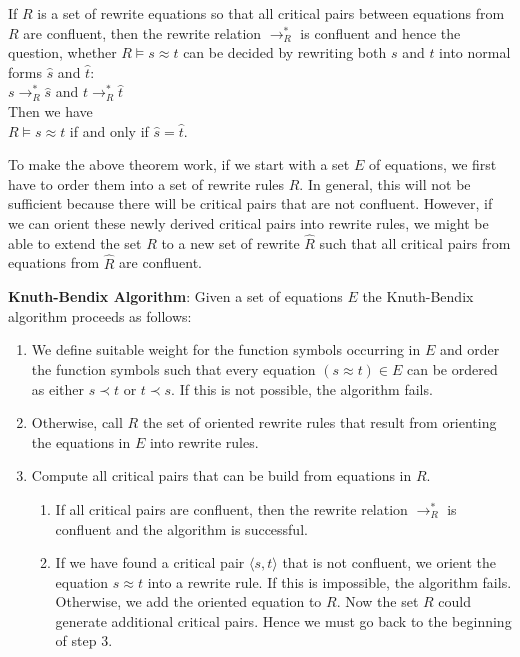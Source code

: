\begin{Theorem}
  If $R$ is a set of rewrite equations so that all critical pairs between equations from $R$ are confluent,
  then the rewrite relation $\rightarrow_R^*$ is confluent and hence the question, whether $R \models s \approx t$
  can be decided by rewriting both $s$ and $t$ into normal forms $\widehat{s}$ and $\widehat{t}$:
  \\[0.2cm]
  \hspace*{1.3cm}
  $s \rightarrow_R^* \widehat{s}$ \quad and \quad  $t \rightarrow_R^* \widehat{t}$ 
  \\[0.2cm]
  Then we have
  \\[0.2cm]
  \hspace*{1.3cm}
  $R \models s \approx t$ \quad if and only if \quad $\widehat{s} = \widehat{t}$.
\end{Theorem}

\noindent
To make the above theorem work, if we start with a set $E$ of equations, we first have to order them into a set
of rewrite rules $R$.  In general, this will not be sufficient because there will be critical pairs that are
not confluent. However, if we can orient these newly derived critical pairs into rewrite rules, we might be
able to extend the set $R$ to a new set of rewrite $\widehat{R}$ such that all critical pairs from equations
from $\widehat{R}$ are confluent.
\vspace*{0.2cm}

\noindent
\textbf{Knuth-Bendix Algorithm}:  Given a set of equations $E$ the Knuth-Bendix algorithm proceeds as follows:
\begin{enumerate}
\item We define suitable weight for the function symbols occurring in $E$ and order the function symbols
      such that every equation  $(s \approx t) \in E$ can be ordered as either $s \prec t$ or $t \prec s$.
      If this is not possible, the algorithm fails.
\item Otherwise, call $R$ the set of oriented rewrite rules that result from orienting the equations in $E$
      into rewrite rules.
\item Compute all critical pairs that can be build from equations in $R$.
      \begin{enumerate}
      \item If all critical pairs are confluent, then the rewrite relation $\rightarrow_R^*$ is confluent
            and the algorithm is successful.
      \item If we have found a critical pair $\langle s, t \rangle$ that is not confluent,
            we orient the equation $s \approx t$ into a rewrite rule.  If this is impossible, the algorithm fails.
            Otherwise, we add the oriented equation to $R$.
            Now the set $R$ could generate additional critical pairs.
            Hence we must go back to the beginning of step 3. \eod
      \end{enumerate}
\end{enumerate}

